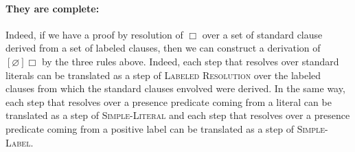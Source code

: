 \documentclass[a4paper,10pt]{report}
\begin{document}
\paragraph{They are complete:}
Indeed, if we have a proof by resolution of $\Box$ over a set of standard clause derived from
a set of labeled clauses, then we can construct a derivation of $[\varnothing]\Box$ by the
three rules above. Indeed, each step that resolves over standard literals can be translated
as a step of \textsc{Labeled Resolution} over the labeled clauses from which the standard
clauses envolved were derived. In the same way, each step that resolves over a presence
predicate coming from a literal can be translated as a step of \textsc{Simple-Literal} and
each step that resolves over a presence predicate coming from a positive label can be
translated as a step of \textsc{Simple-Label}.
\end{document}
